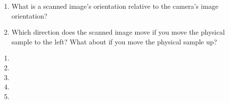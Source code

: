 \documentclass{../signatures}
\begin{document}
\begin{enumerate}

    \item What is a scanned image’s orientation relative to the camera’s image orientation?
    
    \item Which direction does the scanned image move if you move the physical sample to the left? What about if you move the physical sample up?
\\[36pt]
\end{enumerate}


\checkpointsection 

\begin{enumerate}

\item {}

\item {}

\item {}

\item {}

\item {}

\end{enumerate}
\end{document}
